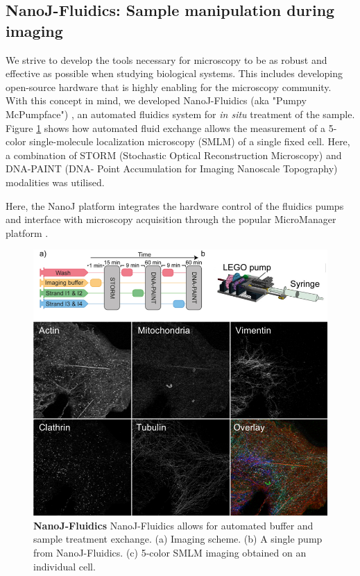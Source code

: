 \subsection*{NanoJ-Fluidics: Sample manipulation during imaging}
We strive to develop the tools necessary for microscopy to be as robust and effective as possible when studying biological systems. This includes developing open-source hardware that is highly enabling for the microscopy community. With this concept in mind, we developed NanoJ-Fluidics (aka "Pumpy McPumpface") \cite{almada2018automating}, an automated fluidics system for \textit{in situ} treatment of the sample. Figure \ref{fig:Pumpy} shows how automated fluid exchange allows the measurement of a 5-color single-molecule localization microscopy (SMLM) of a single fixed cell. Here, a combination of  STORM (Stochastic Optical Reconstruction Microscopy) \cite{rust2006sub, heilemann2008subdiffraction} and DNA-PAINT (DNA- Point Accumulation for Imaging Nanoscale Topography) \cite{sharonov2006wide, jungmann2014multiplexed} modalities was utilised.

Here, the NanoJ platform integrates the hardware control of the fluidics pumps and interface with  microscopy acquisition through the popular MicroManager platform \cite{edelstein2010computer}. 

\begin{figure}[!t]
    \centering
    \includegraphics[width=\linewidth]{Figures/Figure2_v2.png}
    \caption{\textbf{NanoJ-Fluidics} NanoJ-Fluidics allows for automated buffer and sample treatment exchange. (a) Imaging scheme. (b) A single pump from NanoJ-Fluidics. (c) 5-color SMLM imaging obtained on an individual cell.}
    \label{fig:Pumpy}
\end{figure}


